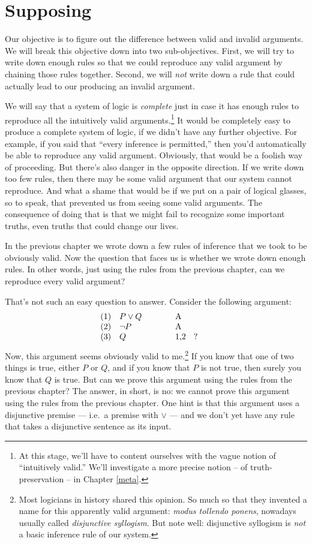 \chapter{Supposing} \label{supp}

Our objective is to figure out the difference between valid and
invalid arguments.  We will break this objective down into two
sub-objectives.  First, we will try to write down enough rules so that
we could reproduce any valid argument by chaining those rules
together.  Second, we will {\it not} write down a rule that could
actually lead to our producing an invalid argument.

We will say that a system of logic is \emph{complete} just in case it
has enough rules to reproduce all the intuitively valid
arguments.\footnote{At this stage, we'll have to content ourselves
  with the vague notion of ``intuitively valid.''  We'll investigate a
  more precise notion -- of truth-preservation -- in Chapter
  \ref{meta}.}  It would be completely easy to produce a complete
system of logic, if we didn't have any further objective.  For
example, if you said that ``every inference is permitted,'' then you'd
automatically be able to reproduce any valid argument.  Obviously,
that would be a foolish way of proceeding.  But there's also danger in
the opposite direction.  If we write down too few rules, then there
may be some valid argument that our system cannot reproduce.  And what
a shame that would be if we put on a pair of logical glasses, so to
speak, that prevented us from seeing some valid arguments.  The
consequence of doing that is that we might fail to recognize some
important truths, even truths that could change our lives.

In the previous chapter we wrote down a few rules of inference that we
took to be obviously valid.  Now the question that faces us is whether
we wrote down enough rules.  In other words, just using the rules from
the previous chapter, can we reproduce every valid argument?

That's not such an easy question to answer.  Consider the following
argument:
\[ \begin{array}{l >{$}p{2cm}<{$} p{1.5cm}}
     (1) & P\vee Q & A \\
     (2) & \neg P & A \\
     (3) & Q & 1,2 \; ?\end{array}
\]
Now, this argument seems obviously valid to me.\footnote{Most
  logicians in history shared this opinion.  So much so that they
  invented a name for this apparently valid argument: \emph{modus
    tollendo ponens}, nowadays usually called \emph{disjunctive
    syllogism}.  But note well: disjunctive syllogism is {\it not} a
  basic inference rule of our system.}  If you know that one of two
things is true, either $P$ or $Q$, and if you know that $P$ is not
true, then surely you know that $Q$ is true.  But can we prove this
argument using the rules from the previous chapter?  The answer, in
short, is no: we cannot prove this argument using the rules from the
previous chapter.  One hint is that this argument uses a disjunctive
premise --- i.e.\ a premise with $\vee$ --- and we don't yet have any
rule that takes a disjunctive sentence as its input.

